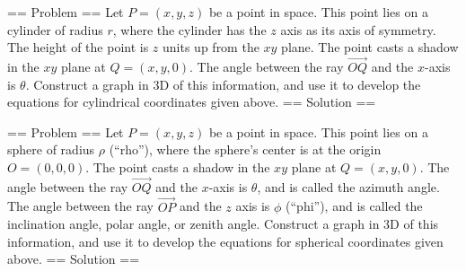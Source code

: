 == Problem ==
Let \(P=(x,y,z)\) be a point in space. This point lies on a cylinder of radius \(r\), where the cylinder has the \(z\) axis as its axis of symmetry.  The height of the point is \(z\) units up from the \(xy\) plane. The point casts a shadow in the \(xy\) plane at \(Q=(x,y,0)\).  The angle between the ray \(\vec{OQ}\) and the \(x\)-axis is \(\theta\). Construct a graph in 3D of this information, and use it to develop the equations for cylindrical coordinates given above.
== Solution ==

== Problem == 
Let
\(P=(x,y,z)\) be a point in space. This point lies on a sphere of
radius \(\rho\) (``rho''), where the sphere's center is at the origin
\(O=(0,0,0)\). The point casts a shadow in the \(xy\) plane at
\(Q=(x,y,0)\).  The angle between the ray \(\vec{OQ}\) and the \(x\)-axis
is \(\theta\), and is called the azimuth angle. The angle between
the ray \(\vec{OP}\) and the \(z\) axis is \(\phi\) (``phi''), and is
called the inclination angle, polar angle, or zenith angle.  Construct
a graph in 3D of this information, and use it to develop the
equations for spherical coordinates given above.
== Solution ==

